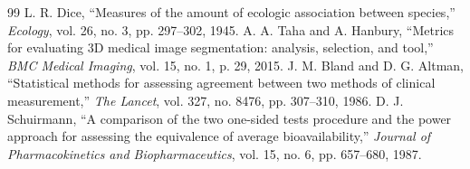 \documentclass[10pt,twocolumn]{article}
\begin{document}
\begin{thebibliography}{99}
 L. R. Dice, ``Measures of the amount of ecologic association between species,'' \textit{Ecology}, vol. 26, no. 3, pp. 297--302, 1945.
 A. A. Taha and A. Hanbury, ``Metrics for evaluating 3D medical image segmentation: analysis, selection, and tool,'' \textit{BMC Medical Imaging}, vol. 15, no. 1, p. 29, 2015.
 J. M. Bland and D. G. Altman, ``Statistical methods for assessing agreement between two methods of clinical measurement,'' \textit{The Lancet}, vol. 327, no. 8476, pp. 307--310, 1986.
 D. J. Schuirmann, ``A comparison of the two one-sided tests procedure and the power approach for assessing the equivalence of average bioavailability,'' \textit{Journal of Pharmacokinetics and Biopharmaceutics}, vol. 15, no. 6, pp. 657--680, 1987.
\end{thebibliography}
\end{document}
